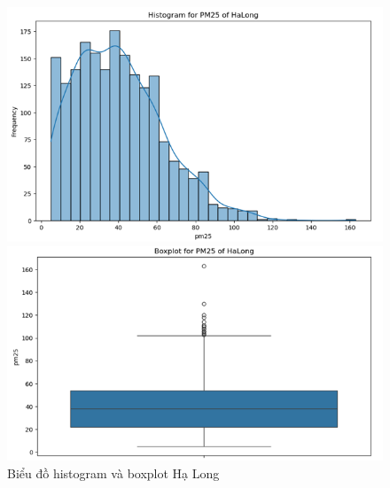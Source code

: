 \begin{figure}[H]
  \centering
  \begin{minipage}{0.22\textwidth}
  \centering
  \end{minipage}
  \hfill

  \begin{minipage}{0.23\textwidth}
      \centering
      \includegraphics[width=1\textwidth]{img/final/Dataset/histogram.png}
      \end{minipage}
      \hfill
      \begin{minipage}{0.24\textwidth}
      \centering
      \includegraphics[width=1\textwidth]{img/final/Dataset/boxplot.png}
      \end{minipage}
  
  \caption{Biểu đồ histogram và boxplot Hạ Long}
  \label{fig:Random_Forest}
\end{figure}


